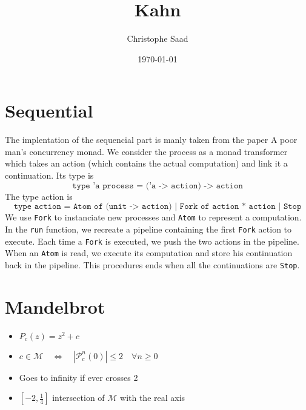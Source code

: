 \documentclass{article}
\title{Kahn}
\author{Christophe Saad}
\date{\today}
\begin{document}
\maketitle

\section{Sequential}
The implentation of the sequencial part is manly taken from the paper  A poor man’s concurrency monad. We consider the process as a monad transformer which takes an action (which contains the actual computation) and link it a continuation. Its type is $$\texttt{type 'a process = ('a -> action) -> action}$$
The type action is $$\texttt{type action  = Atom of (unit -> action) | Fork of action * action | Stop}$$
We use \texttt{Fork} to instanciate new processes and \texttt{Atom} to represent a computation.\\
In the \texttt{run} function, we recreate a pipeline containing the first \texttt{Fork} action to execute. Each time a \texttt{Fork} is executed, we push the two actions in the pipeline. When an \texttt{Atom} is read, we execute its computation and store his continuation back in the pipeline. This procedures ends when all the continuations are \texttt{Stop}.

\section{Mandelbrot}
\begin{itemize}
	\item $P_c(z) = z^2 + c$	
	\item
	$c \in \mathcal{M}  \quad \Longleftrightarrow \quad |\mathcal{P}^n_c(0)| \leq 2 \quad \forall n\geq 0$
	\item Goes to infinity if ever crosses 2
	\item $[-2, \frac{1}{4}]$ intersection of $\mathcal{M}$ with the real axis
\end{itemize}
\end{document}
